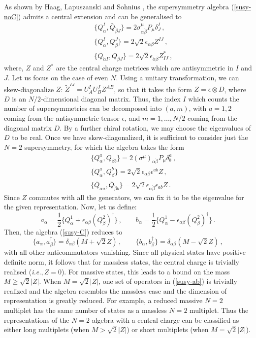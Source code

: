 As shown by Haag, Lapuszanski and Sohnius \cite{HLS}, the
supersymmetry algebra (\ref{susy-noC}) admits a central extension and
can be generalised to 
\begin{eqnarray}
&&\{ Q^{I}_{\alpha}, \bar{Q}_{\dot{\beta}J} \} =
2 \sigma^\mu_{\alpha \dot{\beta}} P_\mu \delta^{I}_{J}\,, 
\nonumber\\
&&\{ Q^I_\alpha, Q^J_\beta \}=2{\sqrt 2}\epsilon_{\alpha\beta} Z^{IJ}\,,
\nonumber \\
&&\{\bar{Q}_{\dot{\alpha}I},\bar{Q}_{\dot{\beta}J} \} =
2{\sqrt 2}\epsilon_{\dot{\alpha} \dot{\beta}} Z^{*}_{IJ}\,,
\label{susy-C}
\end{eqnarray}
where, $Z$ and $Z^*$ are the central charge metrices which are
antisymmetric in $I$ and $J$. Let us focus on the case of even $N$.
Using a unitary transformation, we can skew-diagonalize $Z$:
$\tilde{Z}^{IJ} = U^{I}_{A}U^{J}_{B}Z^{AB}$, so that it takes the form
$Z=\epsilon\otimes D$, where $D$ is an $N/2$-dimensional diagonal
matrix. Thus, the index $I$ which counts the number of supersymmetries
can be decomposed into $(a,m)$, with $a=1,2$ coming from the
antisymmetric tensor $\epsilon$, and $m=1,...,N/2$ coming from the
diagonal matrix $D$.  By a further chiral rotation, we may choose the
eigenvalues of $D$ to be real. Once we have skew-diagonalized, it is
sufficient to consider just the $N=2$ supersymmetry, for which the
algebra takes the form
\begin{eqnarray}
&&\{Q^a_\alpha,{\bar Q}_{\dot\beta b}\}=2(\sigma^\mu)_{\alpha\dot\beta}  
P_\mu \delta^{a}_{b}\,,\nonumber \\
&&\{ Q^a_\alpha,Q^b_\beta\}=2{\sqrt 2}\epsilon_{\alpha\beta}
\epsilon^{ab}Z\,, \nonumber \\ 
&&\{{\bar Q}_{\dot\alpha a},{\bar Q}_{\dot\beta b}\}= 
2{\sqrt 2}\epsilon_{\dot\alpha\dot\beta}\epsilon_{ab} Z \,.
\label{Susy-C'}
\end{eqnarray}
Since $Z$ commutes with all the generators, we can fix it to be
the eigenvalue for the given representation. Now, let us define:
$$
a_\alpha=\frac{1}{2} \{ Q^1_\alpha +
\epsilon_{\alpha\beta} (Q^2_\beta)^\dagger \}\,, \qquad
b_\alpha=\frac{1}{2} \{ Q_\alpha^1 -
\epsilon_{\alpha\beta} (Q^2_\beta)^\dagger \}\,. 
$$
Then, the algebra (\ref{susy-C}) reduces to 
\begin{equation}
\{a_\alpha,a^\dagger_\beta\}=\delta_{\alpha\beta}(M+{\sqrt 2}Z)\,,\qquad
\{ b_\alpha,b^\dagger_\beta\}=\delta_{\alpha\beta} (M-{\sqrt 2}Z)\,,
\label{susy-ab}
\end{equation}
with all other anticommutators vanishing. Since all physical states
have positive definite norm, it follows that for massless states, the
central charge is trivially realised ({\it i.e.},\,$Z=0$). For massive
states, this leads to a bound on the mass $M\geq {\sqrt 2}|Z|$. When
$M={\sqrt 2}|Z|$, one set of operators in (\ref{susy-ab}) is trivially
realized and the algebra resembles the massless case and the dimension
of representation is greatly reduced. For example, a reduced massive
$N = 2$ multiplet has the same number of states as a massless $N = 2$
multiplet. Thus the representations of the $N=2$ algebra with a
central charge can be classified as either long multiplets (when $M >
{\sqrt 2}|Z|$) or short multiplets (when $M={\sqrt 2}|Z|$).
 
